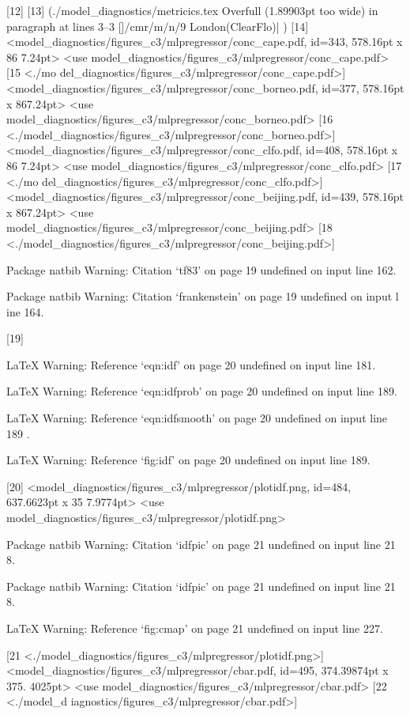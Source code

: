 [12] [13] (./model_diagnostics/metricics.tex
Overfull \hbox (1.89903pt too wide) in paragraph at lines 3--3
[]/cmr/m/n/9 London(ClearFlo)| 
) [14]
<model_diagnostics/figures_c3/mlpregressor/conc_cape.pdf, id=343, 578.16pt x 86
7.24pt> <use model_diagnostics/figures_c3/mlpregressor/conc_cape.pdf> [15 <./mo
del_diagnostics/figures_c3/mlpregressor/conc_cape.pdf>]
<model_diagnostics/figures_c3/mlpregressor/conc_borneo.pdf, id=377, 578.16pt x 
867.24pt> <use model_diagnostics/figures_c3/mlpregressor/conc_borneo.pdf>
[16 <./model_diagnostics/figures_c3/mlpregressor/conc_borneo.pdf>]
<model_diagnostics/figures_c3/mlpregressor/conc_clfo.pdf, id=408, 578.16pt x 86
7.24pt> <use model_diagnostics/figures_c3/mlpregressor/conc_clfo.pdf> [17 <./mo
del_diagnostics/figures_c3/mlpregressor/conc_clfo.pdf>]
<model_diagnostics/figures_c3/mlpregressor/conc_beijing.pdf, id=439, 578.16pt x
 867.24pt> <use model_diagnostics/figures_c3/mlpregressor/conc_beijing.pdf>
[18 <./model_diagnostics/figures_c3/mlpregressor/conc_beijing.pdf>]

Package natbib Warning: Citation `tf83' on page 19 undefined on input line 162.



Package natbib Warning: Citation `frankenstein' on page 19 undefined on input l
ine 164.

[19]

LaTeX Warning: Reference `eqn:idf' on page 20 undefined on input line 181.


LaTeX Warning: Reference `eqn:idfprob' on page 20 undefined on input line 189.


LaTeX Warning: Reference `eqn:idfsmooth' on page 20 undefined on input line 189
.


LaTeX Warning: Reference `fig:idf' on page 20 undefined on input line 189.

[20]
<model_diagnostics/figures_c3/mlpregressor/plotidf.png, id=484, 637.6623pt x 35
7.9774pt> <use model_diagnostics/figures_c3/mlpregressor/plotidf.png>

Package natbib Warning: Citation `idfpic' on page 21 undefined on input line 21
8.


Package natbib Warning: Citation `idfpic' on page 21 undefined on input line 21
8.


LaTeX Warning: Reference `fig:cmap' on page 21 undefined on input line 227.

[21 <./model_diagnostics/figures_c3/mlpregressor/plotidf.png>]
<model_diagnostics/figures_c3/mlpregressor/cbar.pdf, id=495, 374.39874pt x 375.
4025pt> <use model_diagnostics/figures_c3/mlpregressor/cbar.pdf> [22 <./model_d
iagnostics/figures_c3/mlpregressor/cbar.pdf>]

